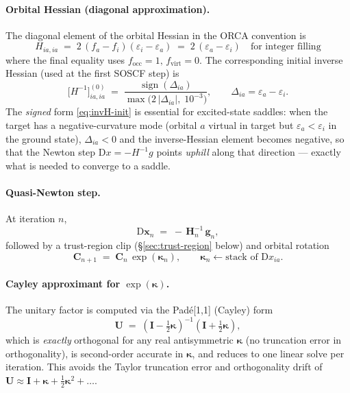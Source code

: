 \documentclass[11pt,a4paper]{article}
\newcommand{\kkappa}{\bm{\kappa}}
\newcommand{\xx}{\mathbf{x}}
\newcommand{\gg}{\mathbf{g}}
\newcommand{\HH}{\mathbf{H}}
\newcommand{\CC}{\mathbf{C}}
\newcommand{\UU}{\mathbf{U}}
\newcommand{\II}{\mathbf{I}}
\begin{document}
\paragraph{Orbital Hessian (diagonal approximation).}
The diagonal element of the orbital Hessian in the ORCA
convention is
\begin{equation}
H_{ia,ia}
\;=\; 2\,(f_a - f_i)(\varepsilon_i - \varepsilon_a)
\;=\; 2\,(\varepsilon_a - \varepsilon_i) \quad \text{for integer filling}
\label{eq:hess-diag}
\end{equation}
where the final equality uses $f_\mathrm{occ}=1,\,f_\mathrm{virt}=0$.
The corresponding initial inverse Hessian (used at the first SOSCF
step) is
\begin{equation}
\big[H^{-1}\big]_{ia,ia}^{(0)}
\;=\;\frac{\operatorname{sign}(\Delta_{ia})}
{\max\!\big(2\,|\Delta_{ia}|,\; 10^{-3}\big)},
\qquad \Delta_{ia}\!=\!\varepsilon_a-\varepsilon_i.
\label{eq:invH-init}
\end{equation}
The \emph{signed} form \eqref{eq:invH-init} is essential for
excited-state saddles: when the target has a negative-curvature mode
(orbital $a$ virtual in target but $\varepsilon_a<\varepsilon_i$ in
the ground state), $\Delta_{ia}<0$ and the inverse-Hessian element
becomes negative, so that the Newton step
$\mathrm{D}x=-H^{-1}g$ points \emph{uphill} along that
direction --- exactly what is needed to converge to a saddle.

\paragraph{Quasi-Newton step.}
At iteration $n$,
\begin{equation}
\mathrm{D}\xx_n \;=\; -\,\HH_n^{-1}\,\gg_n,
\label{eq:newton-step}
\end{equation}
followed by a trust-region clip (\S\ref{sec:trust-region} below) and
orbital rotation
\begin{equation}
\CC_{n+1} \;=\; \CC_n\,\exp(\kkappa_n), \qquad
\kkappa_n \leftarrow \text{stack of } \mathrm{D}x_{ia}.
\end{equation}

\paragraph{Cayley approximant for $\exp(\kkappa)$.}
The unitary factor is computed via the Pad\'e[1,1] (Cayley) form
\begin{equation}
\UU \;=\; (\II-\tfrac12\kkappa)^{-1}(\II+\tfrac12\kkappa),
\label{eq:cayley}
\end{equation}
which is \emph{exactly} orthogonal for any real antisymmetric
$\kkappa$ (no truncation error in orthogonality), is second-order
accurate in $\kkappa$, and reduces to one linear solve per iteration.
This avoids the Taylor truncation error and orthogonality drift of
$\UU \approx \II + \kkappa + \tfrac12\kkappa^2 + \dots$.
\end{document}
